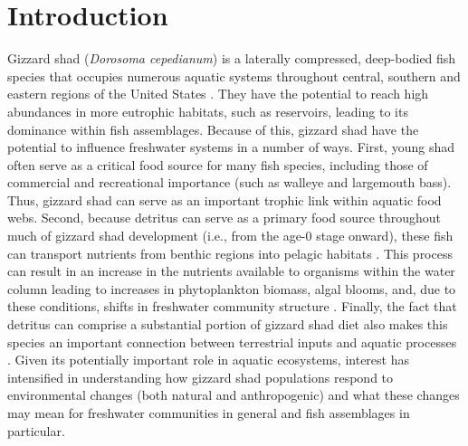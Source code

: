 \documentclass[preprint,review,12pt,authoryear]{elsarticle}
\providecommand{\DIFaddend}{} %
\begin{document}
\DIFaddend \section{Introduction}
Gizzard shad (\emph{Dorosoma cepedianum}) is a laterally compressed, deep-bodied fish species that occupies numerous aquatic systems throughout central, southern and eastern regions of the United States \citep{pierce1981aspects,vanni2005linking}.  
They have the potential to reach high abundances in more eutrophic habitats, such as reservoirs, leading to its dominance within fish assemblages. 
Because of this, gizzard shad have the potential to influence freshwater systems in a number of ways. 
First, young shad often serve as a critical food source for many fish species, including those of commercial and recreational importance (such as walleye and largemouth bass)\citep{jester1972life}. 
Thus, gizzard shad can serve as an important trophic link within aquatic food webs.
Second, because detritus can serve as a primary food source throughout much of gizzard shad development 
(i.e., from the age-0 stage onward), these fish can transport nutrients
from benthic regions into pelagic habitats \citep{mather1995regeneration, schaus2000effects, vanni2005linking}. 
This process can result in an increase in the nutrients available to organisms within the water column leading to increases in phytoplankton biomass, algal blooms, and, due to these conditions, shifts in freshwater community structure \citep{aday2003direct, schaus2000effects}. 
Finally, the fact that detritus can comprise a substantial portion of gizzard shad diet also makes this species an important connection between terrestrial inputs and aquatic processes \citep{schaus2000effects}.
Given its potentially important role in aquatic ecosystems, interest has intensified in understanding how gizzard shad populations respond to environmental changes (both natural and anthropogenic) and what these changes may mean for freshwater communities in general and fish assemblages in particular.
\end{document}
